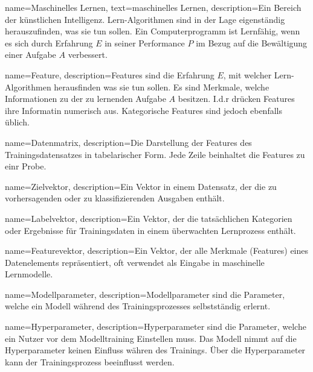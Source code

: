 
{
        name=Maschinelles Lernen,
        text=maschinelles Lernen,
        description={Ein Bereich der künstlichen Intelligenz. Lern-Algorithmen sind in der Lage eigenständig herauszufinden, was sie tun sollen. Ein Computerprogramm ist Lernfähig, wenn es sich durch Erfahrung \(E\) in seiner Performance \(P\) im Bezug auf die Bewältigung einer Aufgabe \(A\) verbessert.}
} 

{
        name=Feature,
        description={Features sind die Erfahrung \(E\), mit welcher Lern-Algorithmen herausfinden was sie tun sollen. Es sind Merkmale, welche Informationen zu der zu lernenden Aufgabe \(A\) besitzen. I.d.r drücken Features ihre Informatin numerisch aus. Kategorische Features sind jedoch ebenfalls üblich.}
}

{
        name=Datenmatrix,
        description={Die Darstellung der Features des Trainingsdatensatzes in tabelarischer Form. Jede Zeile beinhaltet die Features zu einr Probe.}
}

{
        name=Zielvektor,
        description={Ein Vektor in einem Datensatz, der die zu vorhersagenden oder zu klassifizierenden Ausgaben enthält.}
}

{
        name=Labelvektor,
        description={Ein Vektor, der die tatsächlichen Kategorien oder Ergebnisse für Trainingsdaten in einem überwachten Lernprozess enthält.}
}

{
        name=Featurevektor,
        description={Ein Vektor, der alle Merkmale (Features) eines Datenelements repräsentiert, oft verwendet als Eingabe in maschinelle Lernmodelle.}
}

{
        name=Modellparameter,
        description={Modellparameter sind die Parameter, welche ein Modell während des Trainingsprozesses selbstständig erlernt.}
}


{
        name=Hyperparameter,
        description={Hyperparameter sind die Parameter, welche ein Nutzer vor dem Modelltraining Einstellen muss. Das Modell nimmt auf die Hyperparameter keinen Einfluss währen des Trainings. Über die Hyperparameter kann der Trainingsprozess beeinflusst werden.}
}

